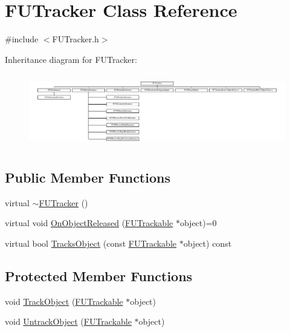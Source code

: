 \hypertarget{classFUTracker}{
\section{FUTracker Class Reference}
\label{classFUTracker}
}


{\ttfamily \#include $<$FUTracker.h$>$}

Inheritance diagram for FUTracker:\begin{figure}[H]
\begin{center}
\leavevmode
\includegraphics[height=3.243243cm]{classFUTracker}
\end{center}
\end{figure}
\subsection*{Public Member Functions}
\begin{DoxyCompactItemize}
\item 
virtual \hyperlink{classFUTracker_afca4004fab633dce9556ee62001939bf}{$\sim$FUTracker} ()
\item 
virtual void \hyperlink{classFUTracker_a7e79d02821b3ccd2fadc460125cb3ca4}{OnObjectReleased} (\hyperlink{classFUTrackable}{FUTrackable} $\ast$object)=0
\item 
virtual bool \hyperlink{classFUTracker_ab58cddea7242921a4b9e6c07dfd64b11}{TracksObject} (const \hyperlink{classFUTrackable}{FUTrackable} $\ast$object) const 
\end{DoxyCompactItemize}
\subsection*{Protected Member Functions}
\begin{DoxyCompactItemize}
\item 
void \hyperlink{classFUTracker_ac94fdeeaca9960f6fd3ace18f08e50dc}{TrackObject} (\hyperlink{classFUTrackable}{FUTrackable} $\ast$object)
\item 
void \hyperlink{classFUTracker_a4fbf9fac469a817c60652d4e4e840e17}{UntrackObject} (\hyperlink{classFUTrackable}{FUTrackable} $\ast$object)
\end{DoxyCompactItemize}


